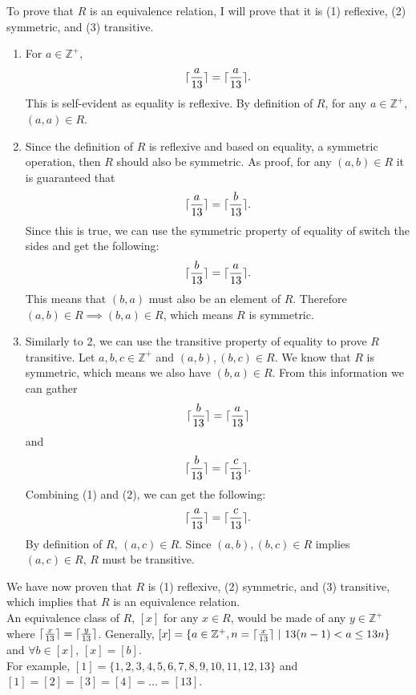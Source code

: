 \documentclass{article}
\DeclarePairedDelimiter{\ceil}{\lceil}{\rceil}
\begin{document}
\section{}
To prove that $R$ is an equivalence relation, I will prove that it is (1) reflexive, (2) symmetric, and (3) transitive.
\begin{enumerate}
    \item For $a \in \mathbb{Z}^+$,
    \begin{equation*}
        \ceil{\frac{a}{13}} = \ceil{\frac{a}{13}}.
    \end{equation*}
    This is self-evident as equality is reflexive. By definition of $R$, for any $a \in \mathbb{Z}^+$, $(a,a) \in R$.
    \item Since the definition of $R$ is reflexive and based on equality, a symmetric operation, then $R$ should also be symmetric. As proof, for any $(a,b) \in R$ it is guaranteed that
    \begin{equation*}
        \ceil{\frac{a}{13}} = \ceil{\frac{b}{13}}.
    \end{equation*}
    Since this is true, we can use the symmetric property of equality of switch the sides and get the following: 
    \begin{equation*}
        \ceil{\frac{b}{13}} = \ceil{\frac{a}{13}}.
    \end{equation*}
    This means that $(b,a)$ must also be an element of $R$. Therefore $(a,b) \in R \implies (b,a) \in R$, which means $R$ is symmetric.
    \item Similarly to 2, we can use the transitive property of equality to prove $R$ transitive. Let $a,b,c \in \mathbb{Z}^+$ and $(a,b),(b,c) \in R$. We know that $R$ is symmetric, which means we also have $(b,a) \in R$. From this information we can gather
    \begin{equation}
        \ceil{\frac{b}{13}} = \ceil{\frac{a}{13}}
    \end{equation}
    and
    \begin{equation}
        \ceil{\frac{b}{13}} = \ceil{\frac{c}{13}}.
    \end{equation}
    Combining (1) and (2), we can get the following:
    \begin{equation*}
        \ceil{\frac{a}{13}} = \ceil{\frac{c}{13}}.
    \end{equation*}
    By definition of $R$, $(a,c) \in R$. Since $(a,b),(b,c) \in R$ implies $(a,c) \in R$, $R$ must be transitive.
\end{enumerate}
We have now proven that $R$ is (1) reflexive, (2) symmetric, and (3) transitive, which implies that $R$ is an equivalence relation. \\
An equivalence class of $R$, $[x]$ for any $x \in R$, would be made of any $y \in \mathbb{Z}^+$ where $\ceil{\frac{x}{13}} = \ceil{\frac{y}{13}}$.
Generally, $[x]= \{a \in \mathbb{Z}^+, n = \ceil{\frac{x}{13}} \ |\ 13(n-1) < a \leq 13n \} $ and $\forall b \in [x]$, $[x] = [b]$. \\
For example, $[1] = \{1, 2, 3, 4, 5, 6, 7, 8, 9, 10, 11, 12, 13\}$ and $[1] = [2] = [3] = [4] = \dots = [13]$.
\end{document}

